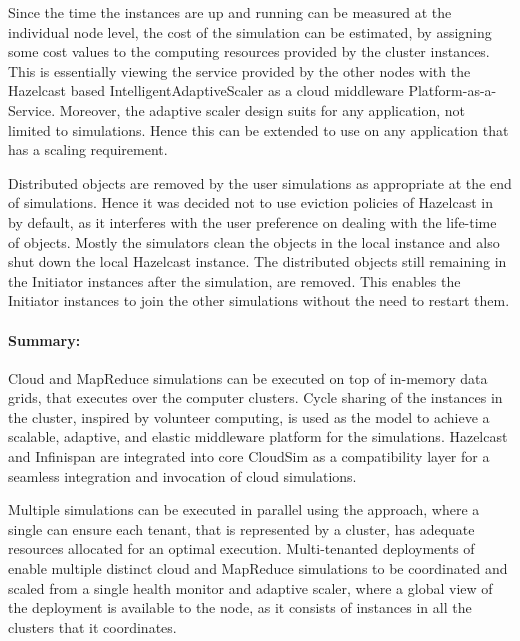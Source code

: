 Since the time the instances are up and running can be measured at the individual node level, the cost of the simulation can be estimated, by assigning some cost values to the computing resources provided by the cluster instances. This is essentially viewing the service provided by the other nodes with the Hazelcast based IntelligentAdaptiveScaler as a cloud middleware Platform-as-a-Service. Moreover, the adaptive scaler design suits for any application, not limited to simulations. Hence this can be extended to use on any application that has a scaling requirement.

Distributed objects are removed by the user simulations as appropriate at the end of simulations. Hence it was decided not to use eviction policies of Hazelcast in  by default, as it interferes with the user preference on dealing with the life-time of objects. Mostly the simulators clean the objects in the local instance and also shut down the local Hazelcast instance. The distributed objects still remaining in the Initiator instances after the simulation, are removed. This enables the Initiator instances to join the other simulations without the need to restart them.

\paragraph*{Summary:}
Cloud and MapReduce simulations can be executed on top of in-memory data grids, that executes over the computer clusters. Cycle sharing of the instances in the cluster, inspired by volunteer computing, is used as the model to achieve a scalable, adaptive, and elastic middleware platform for the simulations. Hazelcast and Infinispan are integrated into core CloudSim as a compatibility layer for a seamless integration and invocation of cloud simulations.

Multiple simulations can be executed in parallel using the  approach, where a single  can ensure each tenant, that is represented by a cluster, has adequate resources allocated for an optimal execution. Multi-tenanted deployments of  enable multiple distinct cloud and MapReduce simulations to be coordinated and scaled from a single health monitor and adaptive scaler, where a global view of the deployment is available to the  node, as it consists of instances in all the clusters that it coordinates.
